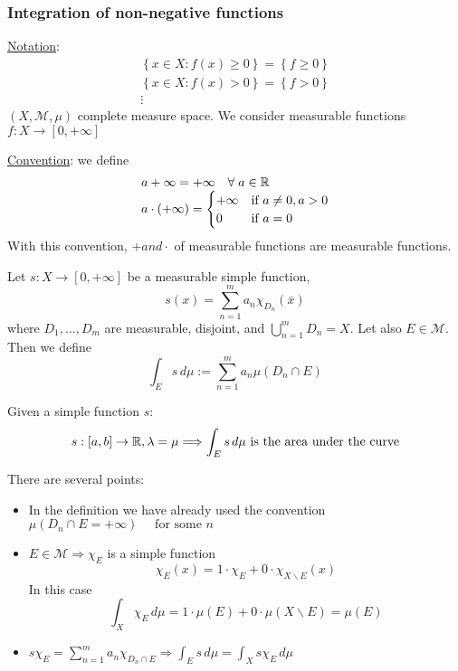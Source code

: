\subsubsection*{Integration of non-negative functions}
\underline{Notation}: \[
    \begin{array}{c}
        \left\{ x \in X : f(x) \geq 0 \right\} = \left\{ f \geq 0 \right\} \\
        \left\{ x \in X : f(x) > 0 \right\} = \left\{ f > 0 \right\}   \\
        \vdots
    \end{array}
    \]
\((X, \mathcal{M}, \mu)\) complete measure space.
We consider measurable functions \(f: X \to [0, +\infty]\)

\underline{Convention}: we define 
\[
    \begin{array}{l}
        a + \infty = +\infty \quad \forall \; a \in \mathbb{R} \\
        a \cdot (+\infty) = \begin{cases}
            +\infty & \mbox{if } a \neq 0, a > 0 \\
            0 & \mbox{if } a = 0
        \end{cases}        
    \end{array}
\]
With this convention, \(+ and \cdot\) of measurable functions are measurable functions.
\begin{definition}
    Let \(s: X \to [0, +\infty]\) be a measurable simple function, 
    \[
        s(x) = \sum_{n=1}^m a_n \chi_{D_n}(\bar{x})
    \]
    where \(D_1,\ldots,D_m\) are measurable, disjoint, and \(\bigcup_{n=1}^m D_n = X\). Let also \(E \in \mathcal{M}\). Then we define 
    \[
        \int_E s \, d\mu := \sum_{n=1}^m a_n \mu(D_n \cap E)
    \]
\end{definition}
\begin{remark}
    Given a simple function \(s\):
    \[s:[a,b] \to \mathbb{R}, \lambda = \mu \Longrightarrow \int_E s \, d\mu \mbox{ is the area under the curve}\]
\end{remark}
\begin{remark}
    There are several points:
    \begin{itemize}
        \item In the definition we have already used the convention \(\mu(D_n \cap E = +\infty) \quad \mbox{ for some }n\)
        \item \(E \in \mathcal{M} \Longrightarrow \chi_E\) is a simple function
        \[
            \chi_E(x) = 1 \cdot \chi_E + 0 \cdot \chi_{X\backslash E}(x)
        \] 
        In this case 
        \[
            \int_X \chi_E \, d\mu = 1\cdot \mu(E) + 0 \cdot \mu(X\backslash E) = \mu(E)
        \]
        \item \(s\chi_E = \sum_{n=1}^m a_n\chi_{D_n \cap E} \Longrightarrow \int_E s\, d\mu = \int_X s\chi_E \, d\mu\)
    \end{itemize}
\end{remark}
